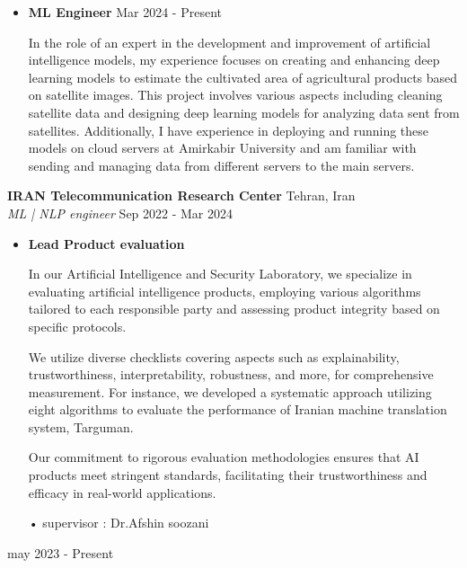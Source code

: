\documentclass[a4paper,9pt]{extarticle}
\begin{document}
\begin{itemize}

\item \textbf{ML Engineer} \hfill Mar 2024 - Present 

In the role of an expert in the development and improvement of artificial intelligence models, my experience focuses on creating and enhancing deep learning models to estimate the cultivated area of agricultural products based on satellite images. This project involves various aspects including cleaning satellite data and designing deep learning models for analyzing data sent from satellites. Additionally, I have experience in deploying and running these models on cloud servers at Amirkabir University and am familiar with sending and managing data from different servers to the main servers.
\end{itemize} %
\begin{itemize}
\end{itemize}
\noindent
\textbf{IRAN Telecommunication Research Center} \hfill Tehran, Iran\\ %
\textit{ML | NLP engineer} \hfill Sep 2022  - Mar 2024 %

\begin{itemize}
    \item \textbf{Lead Product evaluation}
    
In our Artificial Intelligence and Security Laboratory, we specialize in evaluating artificial intelligence products, employing various algorithms tailored to each responsible party and assessing product integrity based on specific protocols.

We utilize diverse checklists covering aspects such as explainability, trustworthiness, interpretability, robustness, and more, for comprehensive measurement. For instance, we developed a systematic approach utilizing eight algorithms to evaluate the performance of Iranian machine translation system, Targuman.

Our commitment to rigorous evaluation methodologies ensures that AI products meet stringent standards, facilitating their trustworthiness and efficacy in real-world applications. 

• supervisor : Dr.Afshin soozani
\end{itemize}\hfill may 2023  - Present %
\end{document}
